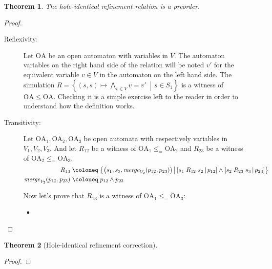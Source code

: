 \documentclass{article}
\theoremstyle{plain}
\newtheorem{thm}{Theorem}
\theoremstyle{definition}
\newcommand\nmm[1]{\(\displaystyle #1\)} %
\newcommand\mpar[1]{{\left(#1\right)}}
\newcommand\mbrk[1]{{\left[#1\right]}}
\newcommand\mbrc[1]{{\left\{#1\right\}}}
\newcommand\midbar{\,\middle|\,}
\newcommand\mset[2]{\mbrc{#1\midbar #2}}
\newcommand\prel[4]{\mbrk{#2\mathrel{#1}#3\midbar #4}}
\newcommand\defobject{\DOTSB\;{\coloneq}\;}
\begin{document}
\begin{thm} The hole-identical refinement relation is a preorder. \end{thm}
\begin{proof}
\begin{description}
\item[Reflexivity:] Let \(\mathrm{OA}\) be an open automaton with variables in \(V\).
	The automaton variables on the right hand side of the relation will be noted \(v'\) for the equivalent variable \(v \in V\) in the automaton on the left hand side.
	The simulation \nmm{R = \mset{\mpar{s, s} \mapsto \bigwedge_{v \in V} v = v'}{s \in S_1}} is a witness of \(\mathrm{OA} \leq \mathrm{OA}\).
	Checking it is a simple exercise left to the reader in order to understand how the definition works.
\item[Transitivity:] Let \(\mathrm{OA}_1, \mathrm{OA}_2, \mathrm{OA}_3\) be open automata with respectively variables in \(V_1, V_2, V_3\).
	And let \(R_{12}\) be a witness of \(\mathrm{OA}_1 \leq_= \mathrm{OA}_2\) and \(R_{23}\) be a witness of \(\mathrm{OA}_2 \leq_= \mathrm{OA}_3\).
	\begin{align*}
		R_{13} \defobject & \mset{\mpar{s_1, s_3, \mathit{merge}_{V_2}\mpar{p_{12}, p_{23}}}}{\prel{R_{12}}{s_1}{s_2}{p_{12}} \wedge \prel{R_{23}}{s_2}{s_3}{p_{23}}} \\
		\mathit{merge}_{V_2}\mpar{p_{12}, p_{23}} \defobject & p_{12} \wedge p_{23} %
	\end{align*}

	Now let's prove that \(R_{13}\) is a witness of \(\mathrm{OA}_1 \leq_= \mathrm{OA}_3\):
	\begin{itemize}
	\item 
	\end{itemize}
\end{description}
\end{proof}
\begin{thm}[Hole-identical refinement correction]
\end{thm}
\begin{proof}
\end{proof}
\end{document}
